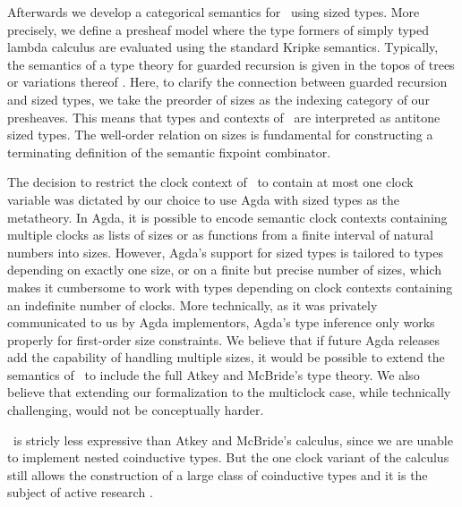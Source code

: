 Afterwards we develop a categorical semantics
for \GTT\ using sized types. More precisely, we define a presheaf
model where the type formers of simply typed lambda calculus are
evaluated using the standard Kripke semantics. Typically, the semantics
of a type theory for guarded recursion is given in the topos of
trees or variations thereof \cite{BMSS-synthetic,MannaaM18,Mogelberg14}.
Here, to clarify the connection between guarded recursion and
sized types, we take the preorder of sizes as the indexing
category of our presheaves. This means that types and contexts of \GTT\ are
interpreted as antitone sized types. 
The well-order relation on sizes is fundamental for constructing a
terminating definition of the semantic fixpoint combinator. 

The decision to restrict the clock context of \GTT\ to contain at 
most one clock variable was dictated by 
our choice to use Agda with sized types as the metatheory. In Agda, 
it is possible to encode semantic clock contexts containing multiple 
clocks as lists of sizes or as functions from a finite interval of 
natural numbers into sizes. However, Agda's support for sized types is 
tailored to types depending on exactly one size, or on a finite but 
precise number of sizes, which makes it cumbersome to work with types 
depending on clock contexts containing an indefinite number of clocks. 
More technically, as it was privately communicated to us by Agda 
implementors, Agda's type inference only works properly for 
first-order size constraints. We believe that if future Agda 
releases add the capability of handling multiple sizes, it would 
be possible to extend the semantics of \GTT\ to include the full 
Atkey and McBride's type theory. We also believe that extending our 
formalization to the multiclock case, while technically challenging, 
would not be conceptually harder. 

\GTT\ is stricly less expressive than Atkey and McBride's calculus, since we are 
unable to implement nested coinductive types. But the one clock 
variant of the calculus still allows the construction of a large 
class of coinductive types and it is the subject of active research
\cite{CloustonBGB15}. 



